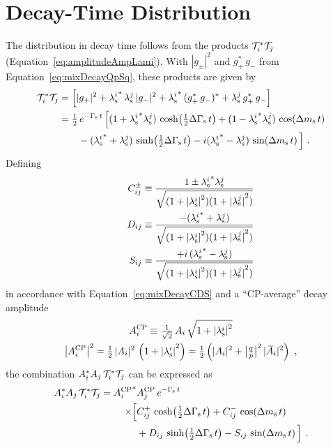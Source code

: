 \section{Decay-Time Distribution}
\label{sec:pheno_time}

The distribution in decay time follows from the products $\timeAmp^*\timeAmp[j]$ (Equation~\ref{eq:amplitudeAmpLami}). With $|g_\pm|^2$ and
$g_+^*\,g_-$ from Equation~\ref{eq:mixDecayQpSq}, these products are given by
\begin{align}
  \label{eq:timeDepProd}
  \timeAmp^*\timeAmp[j]
  &=\left[ |g_+|^2 + \lamsi^*\,\lamsi[j]\, |g_-|^2 + \lamsi^*\, (g_+^*\,g_-)^* + \lamsi[j]\, g_+^*\,g_- \right] \nonumber \\
  &=\tfrac{1}{2}\, \eGst\, \Big[    (1+\lamsi^*\lamsi[j]) \, \cDGs
                                +   (1-\lamsi^*\lamsi[j]) \, \cDms \nonumber \\
  &\quad\quad            -   (\lamsi^* + \lamsi[j])\,   \sDGs
                                - i (\lamsi^* - \lamsi[j])\,   \sDms \Big] \ .
\end{align}
Defining
\begin{equation}
  \label{eq:CDSPolarDep}
  \begin{aligned}
    \Cf[ij]^\pm    &\equiv \frac{1\pm\lamsi^*\lamsi[j]}{\sqrt{(1+\lamsiSq)(1+\lamsiSq[j])}} \\
    \qquad \Df[ij] &\equiv \frac{-    (\lamsi^* + \lamsi[j])}{\sqrt{(1+\lamsiSq)(1+\lamsiSq[j])}} \\
    \qquad \Sf[ij] &\equiv \frac{+i\, (\lamsi^* - \lamsi[j])}{\sqrt{(1+\lamsiSq)(1+\lamsiSq[j])}}
  \end{aligned}
\end{equation}
in accordance with Equation~\ref{eq:mixDecayCDS} and a ``CP-average'' decay amplitude
\begin{equation}
  \label{eq:CPAvAmp}
  \begin{gathered}
    \AAv \equiv \tfrac{1}{\sqrt{2}}\, \Ai\, \sqrt{1+\lamsiSq} \\
    \left|\AAv\right|^2
      = \tfrac{1}{2}\, |\Ai|^2\, \left(1 + \lamsiSq\right)
      = \tfrac{1}{2} \left(|\Ai|^2 + \qpAbsAlt^2\,|\Abari|^2\right) \ ,
  \end{gathered}
\end{equation}
the combination $\Ai^*\Ai[j]\,\timeAmp^*\timeAmp[j]$ can be expressed as
\begin{equation}
  \label{eq:timeDep}
  \begin{aligned}
    \Ai^*\Ai[j]\,\timeAmp^*\timeAmp[j]
      = \AAvConj&\AAv[{\Ai[j]}]\, \eGst \\
        \times\Big[ &\Cf[ij]^+\,\cDGs + \Cf[ij]^-\,\cDms \\
                    &+ \Df[ij]\,\sDGs - \Sf[ij]\,\sDms \Big] \ .
  \end{aligned}
\end{equation}

